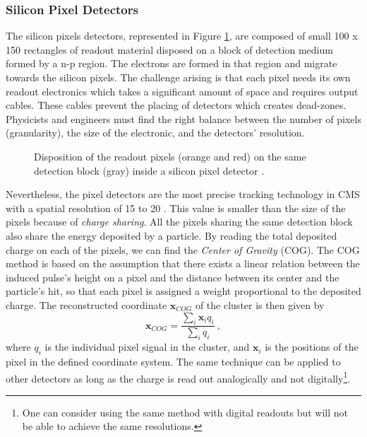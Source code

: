 			\subsubsection{Silicon Pixel Detectors}
			\label{sec:lhc_and_cms__silicon_pixel_detectors}

				The silicon pixels detectors, represented in Figure \ref{fig:lhc_and_cms__cms_pixel_detector}, are composed of small 100 \um{} x 150 \um{} rectangles of readout material disposed on a block of detection medium formed by a n-p region. The electrons are formed in that region and migrate towards the silicon pixels. The challenge arising is that each pixel needs its own readout electronics which takes a significant amount of space and requires output cables. These cables prevent the placing of detectors which creates dead-zones. Physicists and engineers must find the right balance between the number of pixels (granularity), the size of the electronic, and the detectors' resolution. \\

				\begin{figure}[h!]
					\centering
					\caption{Disposition of the readout pixels (orange and red) on the same detection block (gray) inside a silicon pixel detector \Cite{CMS_Tracker_Construction}.}
					\label{fig:lhc_and_cms__cms_pixel_detector}
				\end{figure}

				Nevertheless, the pixel detectors are the most precise tracking technology in CMS with a spatial resolution of 15 to 20 \um{}. This value is smaller than the size of the pixels because of \emph{charge sharing}. All the pixels sharing the same detection block also share the energy deposited by a particle. By reading the total deposited charge on each of the pixels, we can find the \emph{Center of Gravity} (COG). The COG method is based on the assumption that there exists a linear relation between the induced pulse's height on a pixel and the distance between its center and the particle's hit, so that each pixel is assigned a weight proportional to the deposited charge. The reconstructed coordinate $ \mathbf{x}_{COG} $ of the cluster is then given by
				\begin{equation}
					\mathbf{x}_{COG} = \frac{\sum_i \mathbf{x}_i q_i}{\sum_i q_i} \ ,
					\label{eq:lhc_and_cms__charge_sharing}
				\end{equation}
				where $ q_i $ is the individual pixel signal in the cluster, and $ \mathbf{x}_i $ is the positions of the pixel in the defined coordinate system. The same technique can be applied to other detectors as long as the charge is read out analogically and not digitally\footnote{One can consider using the same method with digital readouts but will not be able to achieve the same resolutions.}.

